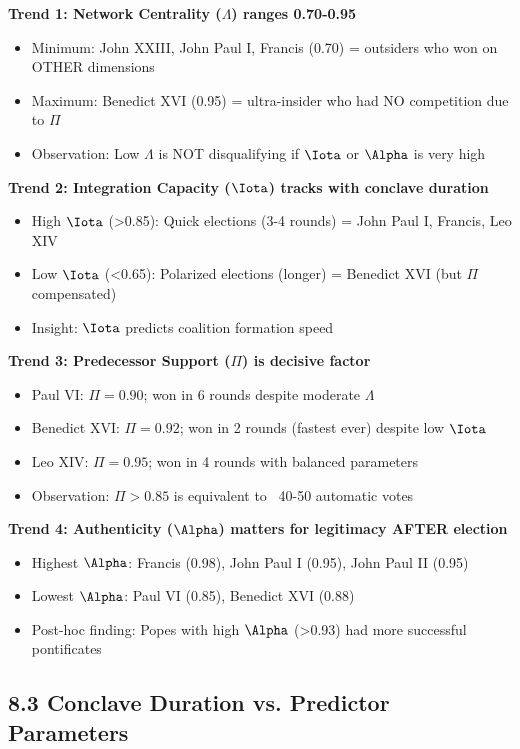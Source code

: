 \textbf{Trend 1: Network Centrality ($\Lambda$) ranges 0.70-0.95}
\begin{itemize}
\item Minimum: John XXIII, John Paul I, Francis (0.70) = outsiders who won on OTHER dimensions
\item Maximum: Benedict XVI (0.95) = ultra-insider who had NO competition due to $\Pi$
\item Observation: Low $\Lambda$ is NOT disqualifying if $\Iota$ or $\Alpha$ is very high
\end{itemize}

\textbf{Trend 2: Integration Capacity ($\Iota$) tracks with conclave duration}
\begin{itemize}
\item High $\Iota$ (>0.85): Quick elections (3-4 rounds) = John Paul I, Francis, Leo XIV
\item Low $\Iota$ (<0.65): Polarized elections (longer) = Benedict XVI (but $\Pi$ compensated)
\item Insight: $\Iota$ predicts coalition formation speed
\end{itemize}

\textbf{Trend 3: Predecessor Support ($\Pi$) is decisive factor}
\begin{itemize}
\item Paul VI: $\Pi=0.90$; won in 6 rounds despite moderate $\Lambda$
\item Benedict XVI: $\Pi=0.92$; won in 2 rounds (fastest ever) despite low $\Iota$
\item Leo XIV: $\Pi=0.95$; won in 4 rounds with balanced parameters
\item Observation: $\Pi > 0.85$ is equivalent to ~40-50 automatic votes
\end{itemize}

\textbf{Trend 4: Authenticity ($\Alpha$) matters for legitimacy AFTER election}
\begin{itemize}
\item Highest $\Alpha$: Francis (0.98), John Paul I (0.95), John Paul II (0.95)
\item Lowest $\Alpha$: Paul VI (0.85), Benedict XVI (0.88)
\item Post-hoc finding: Popes with high $\Alpha$ (>0.93) had more successful pontificates
\end{itemize}

\subsection{8.3 Conclave Duration vs. Predictor Parameters}

